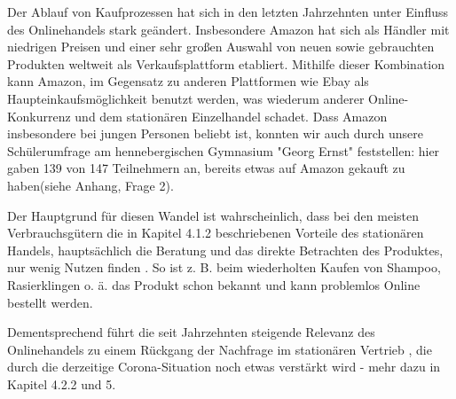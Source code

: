 Der Ablauf von Kaufprozessen hat sich in den letzten Jahrzehnten unter Einfluss des Onlinehandels stark geändert. Insbesondere Amazon hat sich als Händler mit niedrigen Preisen und einer sehr großen Auswahl von neuen sowie gebrauchten Produkten weltweit als Verkaufsplattform etabliert. Mithilfe dieser Kombination kann Amazon, im Gegensatz zu anderen Plattformen wie Ebay als Haupteinkaufsmöglichkeit benutzt werden, was wiederum anderer Online-Konkurrenz und dem stationären Einzelhandel schadet. Dass Amazon insbesondere bei jungen Personen beliebt ist, konnten wir auch durch unsere Schülerumfrage am hennebergischen Gymnasium "Georg Ernst" feststellen: hier gaben 139 von 147 Teilnehmern an, bereits etwas auf Amazon gekauft zu haben(siehe Anhang, Frage 2).

Der Hauptgrund für diesen Wandel ist wahrscheinlich, dass bei den meisten Verbrauchsgütern die in Kapitel 4.1.2 beschriebenen Vorteile des stationären Handels, hauptsächlich die Beratung und das direkte Betrachten des Produktes, nur wenig Nutzen finden \cite[S. 2]{Maier}. So ist z. B. beim wiederholten Kaufen von Shampoo, Rasierklingen o. ä. das Produkt schon bekannt und kann problemlos Online bestellt werden. 
\iffalse
    über zeit unkomplizierter geworden        
    
    verbilligung des onlinehandels > prime-verlust
    amazon = vorreiter, aliexpress
    
    aliexpress: direkt von hersteller kaufen (https://www.emerald.com/insight/content/doi/10.1108/S1745-886220180000013014/full/pdf?title=italicamazon-and-alibabaitalic-internet-governance-business-models-and-internationalization-strategies 345)
\fi
Dementsprechend führt die seit Jahrzehnten steigende Relevanz des Onlinehandels zu einem Rückgang der Nachfrage im stationären Vertrieb \cite{Shankar}, die durch die derzeitige Corona-Situation noch etwas verstärkt wird - mehr dazu in Kapitel 4.2.2 und 5.

\iffalse
 Vorreiter in sachen niedrige Preise > ist sehr wichtig, weil
   viel einfacher vergelichbar, qualität des Produkts nicht einfach einsehbar: sie muss nicht außergewöhnlich, nur akzeptabel sein - jedoch auch nicht schlecht, da 14-tage-rückgabe ohne angabe eines grundes

 
 S 49 https://edoc.sub.uni-hamburg.de/hcu/volltexte/2017/370/pdf/Ebert_Kirsten.pdf
 danach: modell für veränderung
\fi
